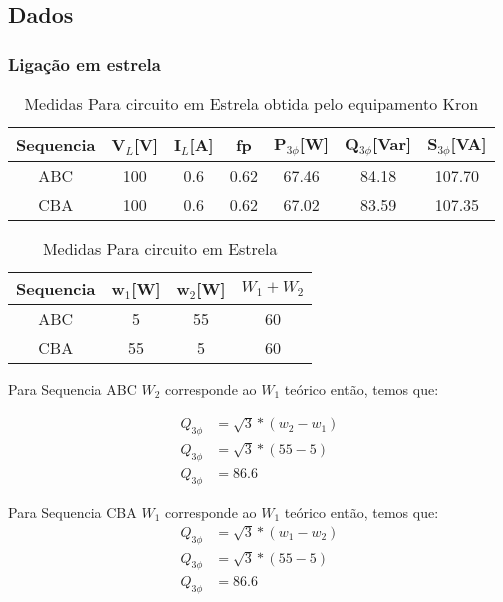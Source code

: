 \documentclass[a4paper, 12pt]{article}
\begin{document}
	\subsection{Dados}
	\subsubsection{Ligação em estrela}
	\justifying
	
	\begin{table}[H]
		\centering
		\begin{tabular}{|c|c|c|c|c|c|c|}
			\hline %
			Sequencia & V$_L$[V] & I$_L$[A] & fp & P$_{3\phi}$[W] & Q$_{3\phi}$[Var] & S$_{3\phi}$[VA] \\
			\hline %
			ABC & 100 & 0.6 & 0.62 & 67.46 & 84.18 & 107.70     \\
			\hline %
			CBA & 100 & 0.6 & 0.62 & 67.02 & 83.59 & 107.35     \\
			\hline %
		\end{tabular}
		\caption{Medidas Para circuito em Estrela obtida pelo equipamento Kron}
	\end{table}
	\begin{table}[H]
		\centering
		\begin{tabular}{|c|c|c|c|}
			\hline %
			Sequencia & w$_1$[W] & w$_2$[W] & $W_1 + W_2$ \\
			\hline %
			ABC & 5 & 55 & 60     \\
			\hline %
			CBA & 55 & 5 & 60     \\
			\hline %
		\end{tabular}
		\caption{Medidas Para circuito em Estrela}
	\end{table}
	
	Para Sequencia ABC $W_2$ corresponde ao $W_1$ teórico então, temos que:
	
	\[\begin{split}
		Q_{3\phi} & = \sqrt{3}\ast(w_2 - w_1) \\
		Q_{3\phi} & = \sqrt{3}\ast(55 - 5 ) \\
		Q_{3\phi} & = 86.6
	\end{split}
	\]
	
	Para Sequencia CBA $W_1$ corresponde ao $W_1$ teórico então, temos que:
	\[\begin{split}
		Q_{3\phi} & = \sqrt{3}\ast(w_1 - w_2) \\
		Q_{3\phi} & = \sqrt{3}\ast(55 - 5 ) \\
		Q_{3\phi} & = 86.6
	\end{split}
	\]
	
\end{document}

